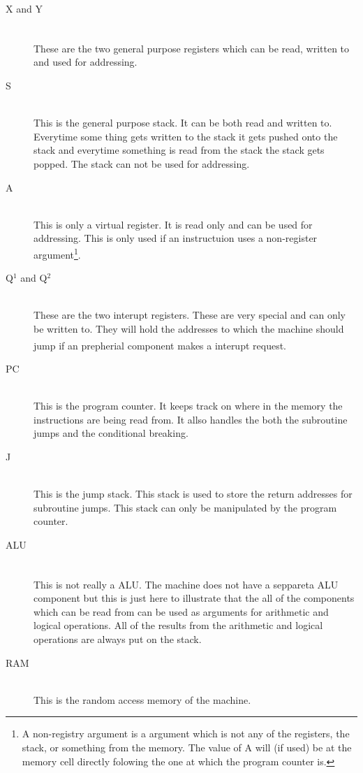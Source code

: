 \documentclass{article}
\begin{document}
\begin{description}
  \item[X and Y] \hfill \\ 
  These are the two general purpose registers\textsuperscript{\cite{register}}
  which can be read, written to and used for addressing.
  \item[S] \hfill \\
  This is the general purpose stack. It can be both read and
  written to. Everytime some thing gets written to the stack it gets pushed onto the
  stack and everytime something is read from the stack the stack gets popped.
  The stack can not be used for addressing.
  \item[A] \hfill \\
  This is only a virtual register. It is read only and can be used for
  addressing. This is only used if an instructuion uses a non-register
  argument\footnote{A non-registry argument is a argument which is not any of
  the registers, the stack, or something from the memory. The value of A will
  (if used) be at the memory cell directly folowing the one at which the
  program counter is.}.
  \item[Q$^1$ and Q$^2$] \hfill \\
  These are the two interupt registers. These are very special and can only be
  written to. They will hold the addresses to which the machine should jump if an
  prepherial component makes a interupt request\textsuperscript{\cite{irq}}.
  
  \item[PC]\hfill \\
  This is the program counter. It keeps track on where in the memory the 
  instructions are being read from. It allso handles the both the subroutine
  jumps and the conditional breaking.
  \item[J]\hfill \\
  This is the jump stack. This stack is used to store the return addresses for
  subroutine jumps. This stack can only be manipulated by the program counter.
  \item[ALU]\hfill \\
  This is not really a ALU\textsuperscript{\cite{alu}}. The machine does not
  have a seppareta ALU component but this is just here to illustrate that the all of the components which can
  be read from can be used as arguments for arithmetic and logical operations.
  All of the results from the arithmetic and logical operations are always put
  on the stack.
  \item[RAM]\hfill \\
  This is the random access memory of the machine.
\end{description}
\end{document}
